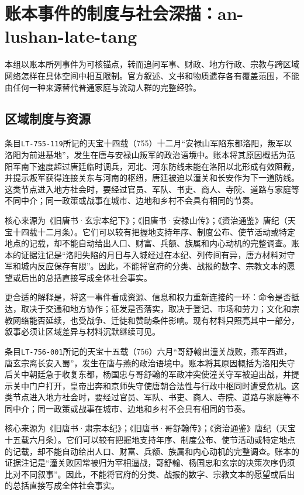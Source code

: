 \section{账本事件的制度与社会深描：an-lushan-late-tang}

\label{sec:ledger-depth-an-lushan-late-tang}

本组以账本所列事件为可核锚点，转而追问军事、财政、地方行政、宗教与跨区域网络怎样在具体空间中相互限制。官方叙述、文书和物质遗存各有覆盖范围，不能由任何一种来源替代普通家庭与流动人群的完整经验。

\subsection{区域制度与资源}

条目\texttt{LT-755-119}所记的天宝十四载（755）十二月“安禄山军陷东都洛阳，叛军以洛阳为前进基地”，发生在唐与安禄山叛军的政治语境中。账本将其原因概括为范阳军南下速度超过唐廷临时调兵，河北、河东防线未能在洛阳以北形成有效阻截，并提示叛军获得连接关东与河南的枢纽，唐廷被迫以潼关和长安作为下一道防线。这类节点进入地方社会时，要经过官员、军队、书吏、商人、寺院、道路与家庭等不同中介；同一政策或战事在城市、边地和乡村不会具有相同的节奏。

核心来源为《旧唐书·玄宗本纪下》；《旧唐书·安禄山传》；《资治通鉴》唐纪（天宝十四载十二月条）。它们可以较有把握地支持年序、制度公布、使节活动或特定地点的记载，却不能自动给出人口、财富、兵额、族属和内心动机的完整调查。账本的证据注记是“洛阳失陷的月日与入城经过在本纪、列传间有异，唐方材料对守军和城内反应保存有限”。因此，不能将官府的分类、战报的数字、宗教文本的愿望或后出的总括直接写成全体社会事实。

更合适的解释是，将这一事件看成资源、信息和权力重新连接的一环：命令是否抵达，取决于交通和地方协作；征发是否落实，取决于登记、市场和劳力；文化和宗教网络能否延续，也受战争、迁徙和赞助条件影响。现有材料只照亮其中一部分，叙事必须让区域差异与材料沉默继续可见。

条目\texttt{LT-756-001}所记的天宝十五载（756）六月“哥舒翰出潼关战败，燕军西进，唐玄宗离长安入蜀”，发生在唐与燕的政治语境中。账本将其原因概括为洛阳失守后关中朝廷急于收复东都，杨国忠与哥舒翰的军政冲突使潼关守军被迫出战，并提示关中门户打开，皇帝出奔和京师失守使唐朝合法性与行政中枢同时遭受危机。这类节点进入地方社会时，要经过官员、军队、书吏、商人、寺院、道路与家庭等不同中介；同一政策或战事在城市、边地和乡村不会具有相同的节奏。

核心来源为《旧唐书·肃宗本纪》；《旧唐书·哥舒翰传》；《资治通鉴》唐纪（天宝十五载六月条）。它们可以较有把握地支持年序、制度公布、使节活动或特定地点的记载，却不能自动给出人口、财富、兵额、族属和内心动机的完整调查。账本的证据注记是“潼关败因常被归为宰相逼战，哥舒翰、杨国忠和玄宗的决策次序仍须比对不同叙事”。因此，不能将官府的分类、战报的数字、宗教文本的愿望或后出的总括直接写成全体社会事实。

